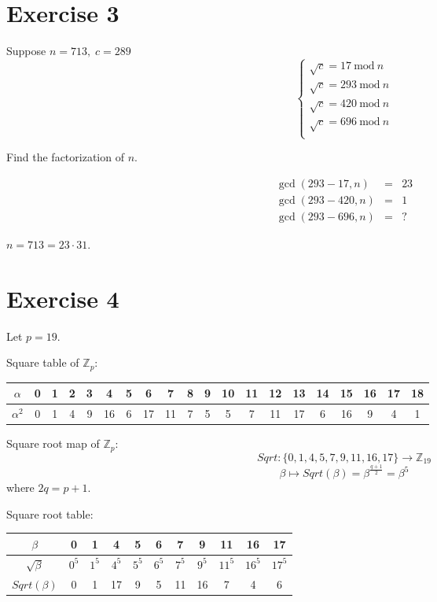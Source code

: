 \documentclass[a4paper]{scrreprt}
\newcommand\Z{\mathbb Z}
\renewcommand\mod{\ \mathrm{mod}\:}
\begin{document}
\section*{Exercise 3}

Suppose $n = 713,\;c = 289$
\[\left\{\begin{array}{ll}
        \sqrt c = 17 \mod n\\
        \sqrt c = 293 \mod n\\
        \sqrt c = 420 \mod n\\
        \sqrt c = 696 \mod n\\
    \end{array}\right.\]

Find the factorization of $n$.

\begin{eqnarray*}
    \gcd(293-17, n) &=& 23 \\
    \gcd(293-420, n) &=& 1 \\
    \gcd(293 - 696, n) &=& ?
\end{eqnarray*}

$n = 713 = 23 \cdot 31$.

\section*{Exercise 4}

Let $p=19$.

Square table of $\Z_p$:
\vspace*{-1em}
\begin{center}
    \begin{tabular}{c|c|c|c|c|c|c|c|c|c|c|c|c|c|c|c|c|c|c|c}
        $\alpha$ & 0 & 1 & 2 & 3 & 4 & 5 & 6 & 7 & 8 & 9 & 10 & 11 & 12 & 13 & 14 & 15 & 16 & 17 & 18\\
        \hline
        $\alpha^2$ & 0 & 1 & 4 & 9 & 16 & 6 & 17 & 11 & 7 & 5 & 5 & 7 & 11 & 17 & 6 & 16 & 9 & 4 & 1\\
    \end{tabular}
\end{center}

Square root map of $\Z_p$:
\[\mathit{Sqrt}: \{0,1,4,5,7,9,11,16,17\}\rightarrow\Z_{19}\]
\[\beta\mapsto\mathit{Sqrt}(\beta)=\beta^{\frac{q+1}2}=\beta^5\]
where $2q=p+1$.

Square root table:
\vspace*{-1em}
\begin{center}
    \begin{tabular}{c|c|c|c|c|c|c|c|c|c|c}
        $\beta$ & 0 & 1 & 4 & 5 & 6 & 7 & 9 & 11 & 16 & 17\\
        \hline
        $\sqrt\beta$ & $0^5$ & $1^5$ & $4^5$ & $5^5$ & $6^5$ & $7^5$ & $9^5$ & $11^5$ & $16^5$ & $17^5$ \\
        $\mathit{Sqrt}(\beta)$ & 0 & 1 & 17 & 9 & 5 & 11 & 16 & 7 & 4 & 6
    \end{tabular}
\end{center}
\end{document}
